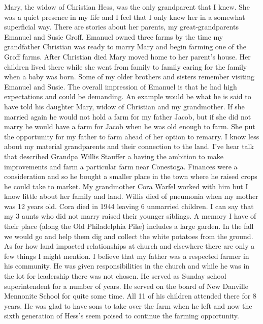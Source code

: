 Mary, the widow of Christian Hess, was the only grandparent that I knew. She was a quiet presence in my life and I feel that I only knew her in a somewhat superficial way. There are stories about her parents, my great-grandparents Emanuel and Susie Groff. Emanuel owned three farms by the time my grandfather Christian was ready to marry Mary and begin farming one of the Groff farms. After Christian died Mary moved home to her parent's house. Her children lived there while she went from family to family caring for the family when a baby was born. Some of my older brothers and sisters remember visiting Emanuel and Susie. The overall impression of Emanuel is that he had high expectations and could be demanding. An example would be what he is said to have told his daughter Mary, widow of Christian and my grandmother. If she married again he would not hold a farm for my father Jacob, but if she did not marry he would have a farm for Jacob when he was old enough to farm. She put the opportunity for my father to farm ahead of her option to remarry.
I know less about my material grandparents and their connection to the land. I've hear talk that described Grandpa Willis Stauffer a having the ambition to make improvements and farm a particular farm near Conestoga. Finances were a consideration and so he bought a smaller place in the town where he raised crops he could take to market. My grandmother Cora Warfel worked with him but I know little about her family and land. Willis died of pneumonia when my mother was 12 years old. Cora died in 1944 leaving 6 unmarried children. I can say that my 3 aunts who did not marry raised their younger siblings. A memory I have of their place (along the Old Philadelphia Pike) includes a large garden. In the fall we would go and help them dig and collect the white potatoes from the ground.
As for how land impacted relationships at church and elsewhere there are only a few things I might mention. I believe that my father was a respected farmer in his community. He was given responsibilities in the church and while he was in the lot for leadership there was not chosen. He served as Sunday school superintendent for a number of years. He served on the board of New Danville Mennonite School for quite some time. All 11 of his children attended there for 8 years. He was glad to have sons to take over the farm when he left and now the sixth generation of Hess's seem poised to continue the farming opportunity.







